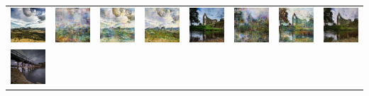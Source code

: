 \documentclass[10pt,twocolumn,letterpaper]{article}
\begin{document}
\begin{table}
\begin{tabular}{c c c c | c c c c}
		\includegraphics[width=5em]{2378_real.jpg}& 
		\includegraphics[width=5em]{2378_leo.jpg} & 
		\includegraphics[width=5em]{2378_gen.jpg} &
		\includegraphics[width=5em]{2378_unet.jpg} &
		\includegraphics[width=5em]{7033_real.jpg}& 
		\includegraphics[width=5em]{7033_leo.jpg} & 
		\includegraphics[width=5em]{7033_gen.jpg} &
		\includegraphics[width=5em]{7033_unet.jpg} \\
		\includegraphics[width=5em]{2605_real.jpg}& 

\end{tabular}
\end{table}
\end{document}
